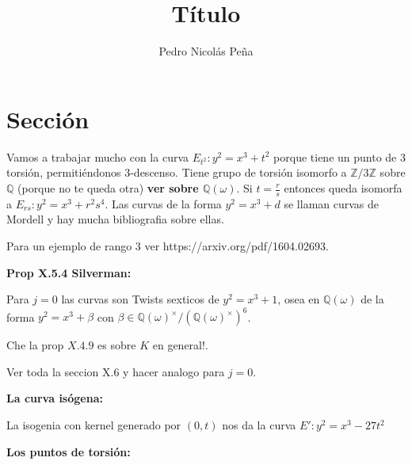 \documentclass[12pt]{amsart}
\title{Título}
\author{Pedro Nicolás Peña}
\newcommand{\QQ}{\mathbb{Q}}
\newcommand{\ZZ}{\mathbb{Z}}
\theoremstyle{plain}
\begin{document}
\maketitle


\section*{Sección}

Vamos a trabajar mucho con la curva $E_{t^2}: y^2 = x^3 + t^2$ porque tiene un punto de 3 torsión, permitiéndonos 3-descenso. Tiene grupo de torsión isomorfo a $\ZZ/3\ZZ$ sobre $\QQ$ (porque no te queda otra) \textbf{ver sobre $\QQ(\omega)$}. Si $t = \frac{r}{s}$ entonces queda isomorfa a $E_{rs}: y^2 = x^3 +r^2s^4$. Las curvas  de la forma $y^2 = x^3 + d$ se llaman curvas de Mordell y hay mucha bibliografia sobre ellas.

Para un ejemplo de rango 3 ver https://arxiv.org/pdf/1604.02693.



\textbf{Prop X.5.4 Silverman:}

Para $j=0$ las curvas son Twists sexticos de $y^2 = x^3 + 1$, osea en $\QQ(\omega)$ de la forma $y^2 = x^3 + \beta$ con $\beta \in {\QQ(\omega)}^\times/ {({\QQ(\omega)}^\times)}^6$.

Che la prop $X.4.9$ es sobre $K $ en general!.

Ver toda la seccion X.6 y hacer analogo para $j=0$. 

\textbf{La curva isógena:}

La isogenia con kernel generado por $(0,t)$ nos da la curva $E':y^2 = x^3 -27t^2$

\textbf{Los puntos de torsión:}
\end{document}
